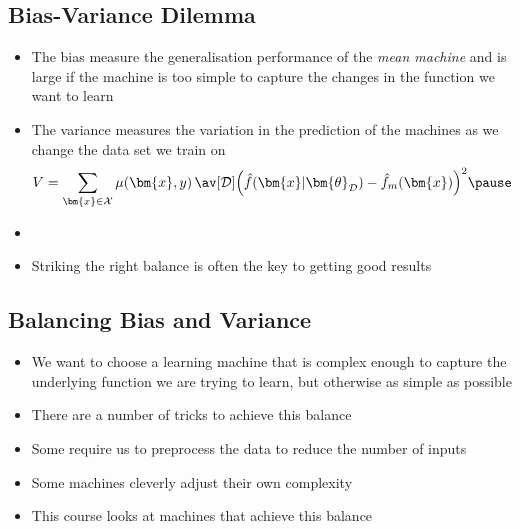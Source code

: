 \begin{slide}
\section{Bias-Variance Dilemma}

\begin{PauseHighLight}
  \begin{itemize}
  \item The bias measure the generalisation performance of the
    \textit{mean machine} and is large if the machine is too simple to
    capture the changes in the function we want to learn\pause
  \item The variance measures the variation in the prediction of the
    machines as we change the data set we train on
    \begin{align*}
      V =  \sum_{\bm{x}\in\mathcal{X}} \mu(\bm{x},y)\,
      \av[\mathcal{D}]{ \left(\hat{f}(\bm{x}\vert \bm{\theta}_{\mathcal{D}})
      - \hat{f}_m(\bm{x})\right)^2 }\pause
    \end{align*}
  \item {}\pause
  \item Striking the right balance is often the key to getting good
    results\pause 
  \end{itemize}
\end{PauseHighLight}

\end{slide}


\begin{slide}
\section[-1]{Balancing Bias and Variance}

\begin{PauseHighLight}
  \begin{itemize}
  \item We want to choose a learning machine that is complex enough to
    capture the underlying function we are trying to learn, but
    otherwise as simple as possible\pause
  \item There are a number of tricks to achieve this balance\pause
  \item Some require us to preprocess the data to reduce the number of
    inputs\pause
  \item Some machines cleverly adjust their own complexity\pause
  \item This course looks at machines that achieve this balance\pause
  \end{itemize}
\end{PauseHighLight}

\end{slide}

